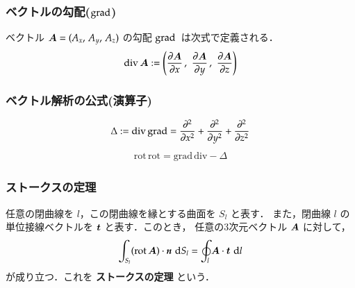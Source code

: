  \subsubsection{ベクトルの勾配($\rm{grad}$)}
        ベクトル $\boldsymbol{A}=(A_{x},\, A_{y},\, A_{z})$ の勾配 $\mathrm{grad}\,$ は次式で定義される．
            \begin{align}
                \mathrm{div}\,\boldsymbol{A}:=
                \left(
                \frac{\partial \boldsymbol{A}}{\partial x}\, ,\,\,
                \frac{\partial \boldsymbol{A}}{\partial y}\, ,\,\,
                \frac{\partial \boldsymbol{A}}{\partial z}
                \right)
            \end{align}




 \subsubsection{ベクトル解析の公式(演算子)}
            \begin{align}
                \Delta:=
                \mathrm{div\, grad}=
                \frac{\partial^{2}}{\partial x^{2}}+
                \frac{\partial^{2}}{\partial y^{2}}+
                \frac{\partial^{2}}{\partial z^{2}}
            \end{align}
            \begin{align}
                \mathrm{rot\, rot}
                =\mathrm{grad\, div}-\Delta
            \end{align}



 \subsubsection{ストークスの定理}
        任意の閉曲線を $l$，この閉曲線を縁とする曲面を $S_{l}$ と表す．
        また，閉曲線 $l$ の単位接線ベクトルを $\boldsymbol{t}$ と表す．このとき，
        任意の3次元ベクトル $\boldsymbol{A}$ に対して，
            \begin{align}
                \int_{S_{l}} (\mathrm{rot}\, \boldsymbol{A})\cdot\textit{\textbf{n}}\,\,\mathrm{d} S_{l}
                =\oint_{l} \boldsymbol{A}\cdot\boldsymbol{t}\,\,\mathrm{d} l
            \end{align}
        が成り立つ．これを \textbf{ストークスの定理} という．


